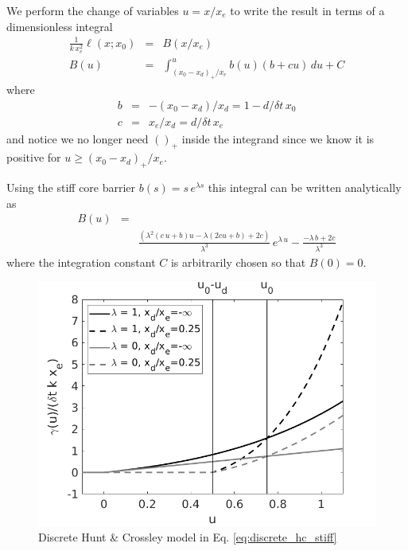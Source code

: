 We perform the change of variables $u=x/x_e$ to write the result in
terms of a dimensionless integral
\begin{eqnarray}
    \frac{1}{k\,x_e^2}\ell(x; x_0) &=& B(x/x_e)\\
    B(u) &=& \int_{(x_0-x_d)_+/x_e}^{u}b(u)(b+cu)\,du + C
\end{eqnarray}
where 
\begin{eqnarray*}
   b &=&  -(x_0-x_d)/x_d = 1 - d/\delta t\,x_0\\
   c &=& x_e/x_d = d/\delta t\,x_e
\end{eqnarray*}
and notice we no longer need $()_+$ inside the integrand since we know it is
positive for $u\ge (x_0-x_d)_+/x_e$.

Using the stiff core barrier $b(s)=s\,e^{\lambda s}$ this integral can be
written analytically as
\begin{eqnarray}
    B(u) &=& \\
    &&\frac{
        \left( \lambda^2( c\, u+b)u-\lambda(2 c u+b) +2 c\right)
        }{\lambda^3}\,e^{\lambda\,u} - \frac{-\lambda\,b+2c}{\lambda^3}\nonumber
    \label{eq:discrete_hc_potential}
\end{eqnarray}
where the integration constant $C$ is arbitrarily chosen so that $B(0)=0$.

\begin{figure}[!h]
    \centering
    \includegraphics[width=0.8\columnwidth]{figures/discrete_hc.png}
    \caption{Discrete Hunt \& Crossley model in Eq. \eqref{eq:discrete_hc_stiff}}
    \label{fig:discrete_hc}
\end{figure}

